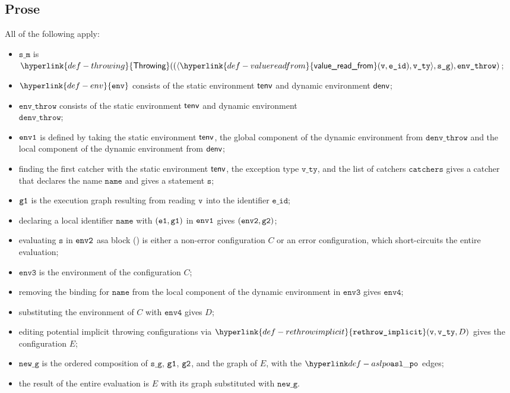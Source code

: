 \documentclass{book}
\newcommand\ProseOrError[0]{or an error configuration, which short-circuits the entire evaluation}
\newcommand\rethrowimplicit[0]{\hyperlink{def-rethrowimplicit}{\texttt{rethrow\_implicit}}}
\newcommand\valuereadfrom[0]{\hyperlink{def-valuereadfrom}{\textsf{value\_read\_from}}}
\newcommand\Throwing[0]{\hyperlink{def-throwing}{\textsf{Throwing}}}
\newcommand\env[0]{\hyperlink{def-env}{\texttt{env}}}
\newcommand\envthree[0]{\texttt{env3}}
\newcommand\envfour[0]{\texttt{env4}}
\newcommand\newg[0]{\texttt{new\_g}}
\newcommand\vs[0]{\texttt{s}}
\newcommand\veone[0]{\texttt{e1}}
\newcommand\name[0]{\texttt{name}}
\newcommand\catchers[0]{\texttt{catchers}}
\newcommand\envthrow[0]{\texttt{env\_throw}}
\newcommand\denvthrow[0]{\texttt{denv\_throw}}
\newcommand\sm[0]{\texttt{s\_m}}
\newcommand\sg[0]{\texttt{s\_g}}
\newcommand\vvty[0]{\texttt{v\_ty}}
\newcommand\eid[0]{\texttt{e\_id}}
\begin{document}
  \subsection{Prose}
  All of the following apply:
  \begin{itemize}
    \item $\sm$ is $\Throwing((\langle \valuereadfrom(\vv, \eid), \vvty \rangle, \sg), \envthrow)$;
    \item $\env$ consists of the static environment $\textsf{tenv}$ and dynamic environment $\textsf{denv}$;
    \item $\envthrow$ consists of the static environment $\textsf{tenv}$ and dynamic environment \\ $\denvthrow$;
    \item $\texttt{env1}$ is defined by taking the static environment $\textsf{tenv}$, the global component of the dynamic
    environment from $\denvthrow$ and the local component of the dynamic environment from $\textsf{denv}$;
    \item finding the first catcher with the static environment $\textsf{tenv}$, the exception type $\vvty$,
    and the list of catchers $\catchers$ gives a catcher that declares the name $\name$ and gives a statement $\vs$;
    \item $\texttt{g1}$ is the execution graph resulting from reading $\texttt{v}$ into the identifier $\eid$;
    \item declaring a local identifier $\name$ with $(\veone, \vgone)$ in $\texttt{env1}$ gives $(\texttt{env2}, \texttt{g2})$;
    \item evaluating $\vs$ in $\texttt{env2}$ asa block () is either a non-error
    configuration $C$ \ProseOrError;
    \item $\envthree$ is the environment of the configuration $C$;
    \item removing the binding for $\name$ from the local component of the dynamic environment in $\envthree$
    gives $\envfour$;
    \item substituting the environment of $C$ with $\envfour$ gives $D$;
    \item editing potential implicit throwing configurations via $\rethrowimplicit(\vv, \vvty, D)$
    gives the configuration $E$;
    \item $\newg$ is the ordered composition of $\sg$, $\texttt{g1}$, $\texttt{g2}$, and the graph of $E$,
    with the $\aslpo$ edges;
    \item the result of the entire evaluation is $E$ with its graph substituted with $\newg$.
  \end{itemize}
\end{document}
